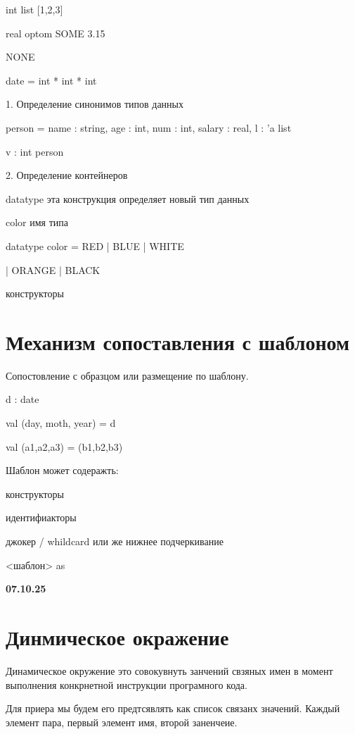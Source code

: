 \documentclass{article}
\begin{document}
int list \hspace{15mm}[1,2,3]

real optom \hspace{10mm}SOME 3.15

            \hspace{25mm}NONE

date \hspace{10mm}= int * int * int

1. Определение синонимов типов данных 

person = {name : string, age : int, num : int, salary : real, l : 'a list}

v : int person

2. Определение контейнеров


datatype эта конструкция определяет новый тип данных

color имя типа

datatype color = RED | BLUE | WHITE

\hspace{27mm} | ORANGE | BLACK

\hspace{27mm} конструкторы


\section{Механизм сопоставления с шаблоном}

Сопостовление с образцом или размещение по шаблону. 

d : date 

val (day, moth, year) = d 

val (a1,a2,a3) = (b1,b2,b3)

Шаблон может содеражть:

конструкторы

идентифиакторы

джокер / whildcard или же нижнее подчеркивание

<шаблон> as

\textbf{07.10.25}

\section{Динмическое окражение}

Динамическое окружение  это совокувнуть занчений свзяных имен в момент выполнения конкрнетной инструкции 
програмного кода.

Для приера мы будем его предтсявлять как список связанх значений. Каждый элемент пара, первый элемент 
имя, второй заненчеие.
\end{document}
